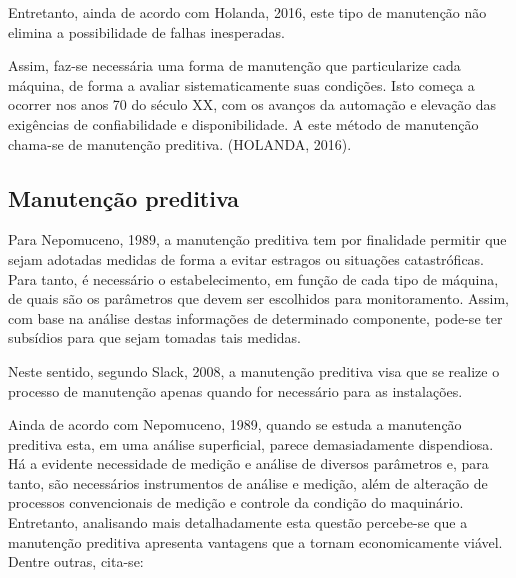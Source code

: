 \documentclass[
	12pt,				
	oneside,			
	a4paper,			
	english,			
	brazil,			
	]{abntex2ppgsi}
\begin{document}
	Entretanto, ainda de acordo com Holanda, 2016, este tipo de manutenção não elimina a possibilidade de falhas inesperadas.

	Assim, faz-se necessária uma forma de manutenção que particularize cada máquina, de forma a avaliar sistematicamente suas condições. Isto começa a ocorrer nos anos 70 do século XX, com os avanços da automação e elevação das exigências de confiabilidade e disponibilidade. A este método de manutenção chama-se de manutenção preditiva. (HOLANDA, 2016).  

\subsection{\textbf{Manutenção preditiva}}

Para Nepomuceno, 1989, a manutenção preditiva tem por finalidade permitir que sejam adotadas medidas de forma a evitar estragos ou situações catastróficas. Para tanto, é necessário o estabelecimento, em função de cada tipo de máquina, de quais são os parâmetros que devem ser escolhidos para monitoramento. Assim, com base na análise destas informações de determinado componente, pode-se ter subsídios para que sejam tomadas tais medidas. 




Neste sentido, segundo Slack, 2008, a manutenção preditiva visa que se realize o processo de manutenção apenas quando for necessário para as instalações. 

Ainda de acordo com Nepomuceno, 1989, quando se estuda a manutenção preditiva esta, em uma análise superficial, parece demasiadamente dispendiosa. Há a evidente necessidade de medição e análise de diversos parâmetros e, para tanto, são necessários instrumentos de análise e medição, além de alteração de processos convencionais de medição e controle da condição do maquinário. Entretanto, analisando mais detalhadamente esta questão percebe-se que a manutenção preditiva apresenta vantagens que a tornam economicamente viável. Dentre outras, cita-se: 
\end{document}
